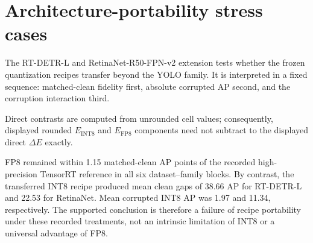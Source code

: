 \documentclass[10pt]{article}
\newcommand{\Jclean}{\mathrm{J95}}
\newcommand{\DeltaE}{\Delta E}
\begin{document}
\FloatBarrier

\section{Architecture-portability stress cases}

The RT-DETR-L and RetinaNet-R50-FPN-v2 extension tests whether the frozen
quantization recipes transfer beyond the YOLO family. It is interpreted in a
fixed sequence: matched-clean fidelity first, absolute corrupted AP second,
and the corruption interaction third.

\begin{table}[htbp]
\centering
\caption{Matched JPEG-95 clean AP and clean quantization gaps for the
architecture-portability stress cases.}
\label{tab:cross-clean}
\scriptsize
\resizebox{\textwidth}{!}{}
\end{table}

\begin{table}[htbp]
\centering
\caption{Canonical cross-family interaction summaries under
$E=Q_c-Q_{\Jclean}$. Negative INT8 means largely reflect contraction of a large
clean gap near low corrupted AP.}
\label{tab:cross-interaction}
\scriptsize
\resizebox{\textwidth}{!}{}
\end{table}

\begin{table}[htbp]
\centering
\caption{Descriptive direct $\DeltaE$ summaries for the architecture stress
cases. These values are not evidence of intrinsic datatype superiority.}
\label{tab:cross-direct}
\small
\resizebox{0.72\textwidth}{!}{}
\end{table}

Direct contrasts are computed from unrounded cell values; consequently,
displayed rounded $E_{\mathrm{INT8}}$ and $E_{\mathrm{FP8}}$ components need not
subtract to the displayed direct $\DeltaE$ exactly.

\begin{table}[htbp]
\centering
\caption{Per-dataset matched engine-only runtime for the architecture stress
cases. Ratios are formed within each dataset and family.}
\label{tab:cross-runtime-dataset}
\scriptsize
\resizebox{\textwidth}{!}{}
\end{table}

FP8 remained within 1.15 matched-clean AP points of the recorded high-precision TensorRT reference in all
six dataset--family blocks. By contrast, the transferred INT8 recipe produced
mean clean gaps of 38.66 AP for RT-DETR-L and 22.53 for RetinaNet. Mean
corrupted INT8 AP was 1.97 and 11.34, respectively. The supported conclusion is
therefore a failure of recipe portability under these recorded treatments, not
an intrinsic limitation of INT8 or a universal advantage of FP8.
\end{document}
